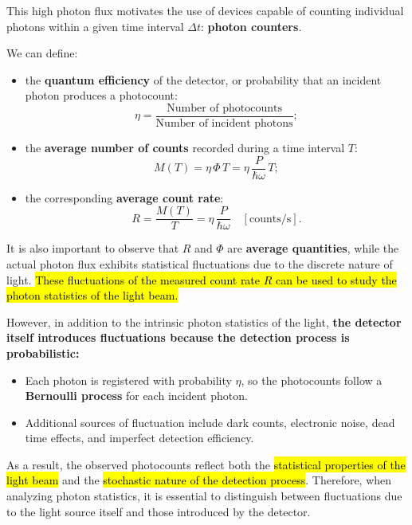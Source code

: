 This high photon flux motivates the use of devices capable of counting individual photons within a given time interval $\Delta t$: \textbf{photon counters}.

We can define:

\begin{itemize}
\item  the \textbf{quantum efficiency} of the detector, or probability that an incident photon produces a photocount:
\begin{equation}\label{eqn:7-quantum-efficiency}
\eta = \frac{\text{Number of photocounts}}{\text{Number of incident photons}};
\end{equation}

\item  the \textbf{average number of counts} recorded during a time interval $T$: 
\begin{equation}\label{eqn:7-average-counts}
M(T) = \eta \, \Phi \, T = \eta \, \frac{P}{\hbar \omega} \, T;
\end{equation}

\item the corresponding \textbf{average count rate}:
\begin{equation}\label{eqn:7-average-count-rate}
R = \frac{M(T)}{T} = \eta \, \frac{P}{\hbar \omega} \quad [\text{counts/s}].
\end{equation}

\end{itemize}


It is also important to observe that $R$ and $\Phi$ are \textbf{average quantities}, while the actual photon flux exhibits statistical fluctuations due to the discrete nature of light. \hl{These fluctuations of the measured count rate $R$ can be used to study the photon statistics of the light beam.}

However, in addition to the intrinsic photon statistics of the light, \textbf{the detector itself introduces fluctuations because the detection process is probabilistic:}
\begin{itemize}
    \item Each photon is registered with probability $\eta$, so the photocounts follow a \textbf{Bernoulli process} for each incident photon.
    \item Additional sources of fluctuation include dark counts, electronic noise, dead time effects, and imperfect detection efficiency.
\end{itemize}
As a result, the observed photocounts reflect both the \hl{statistical properties of the light beam} and the \hl{stochastic nature of the detection process}. Therefore, when analyzing photon statistics, it is essential to distinguish between fluctuations due to the light source itself and those introduced by the detector.
